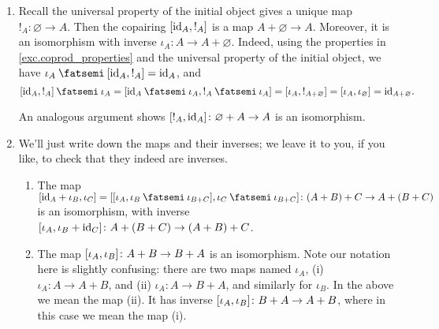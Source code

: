 \documentclass[7Sketches]{subfiles}
\begin{document}
{\begin{enumerate}
To show that $+$ is a functor, we need to also show it preserves composition.
Suppose we also have a morphism $(h,k)\colon (C,D) \to (E,F)$ in $\cat{C} \times
\cat{C}$. We need to show that $(f+g) \cp (h+k) = (f \cp h) + (g \cp k)$. This
is a slightly more complicated version of the argument in
\cref{exc.coprod_properties} 3. It follows from the fact the diagram below
commutes:
\[
    \begin{tikzcd}[ampersand replacement=\&]
      A \ar[rr,"\iota_A"] \ar[dr,"f"'] \& \& A+B \ar[d, "f+g"] \&\& B
      \ar[ll,"\iota_B"'] \ar[dl, "g"] \\[5pt]
      \& C \ar[r, "\iota_C"] \ar[dr,"h\cp \iota_E"'] \& C+D \ar[d,"h+k" near
      start] \& D
      \ar[l,"\iota_D"'] \ar[dl, "k \cp \iota_F"] \\[5pt]
      \&\& E+F
    \end{tikzcd}
\]
Indeed, we again use the uniqueness of the copairing in
\eqref{eqn.universal_prop_coprod}, this time to show that $(f \cp h) + (g \cp
k)=\copair{f\cp h \cp \iota_E, g\cp k \cp \iota_F} = (f+g) \cp (h+k)$, as
required.

\item Recall the universal property of the initial object gives a unique map
$!_A\colon \varnothing \to A$. Then the copairing $[\mathrm{id}_A,!_A]$ is a map
$A+\varnothing \to A$. Moreover, it is an isomorphism with inverse $\iota_A
\colon A \to A +\varnothing$. Indeed, using the properties in
\cref{exc.coprod_properties} and the universal property of the initial object,
we have $\iota_A \cp \copair{\id_A,!_A} = \id_A$, and 
\[
\copair{\id_A,!_A} \cp \iota_A = \copair{\id_A \cp \iota_A, !_A \cp \iota_A} =
\copair{\iota_A,!_{A+\varnothing}} = \copair{\iota_A,\iota_\varnothing} =
\id_{A+\varnothing}.
\]

An analogous argument shows $[!_A,\mathrm{id}_A] \colon \varnothing +A \to A$ is
an isomorphism.

\item We'll just write down the maps and their inverses; we leave it to you, if
you like, to check that they indeed are inverses.
\begin{enumerate}
\item The map $\copair{\id_A +\iota_B,\iota_C} = \copair{\copair{\iota_A,\iota_B \cp
\iota_{B+C}},\iota_C\cp\iota_{B+C}} \colon (A+B)+C \to A+(B+C)$ is an isomorphism,
with inverse $[\iota_A, \iota_B+\mathrm{id}_C] \colon A+(B+C) \to (A+B)+C$.
\item The map $[\iota_A,\iota_B]\colon A+B \to B+A$ is an isomorphism.
Note our notation here is slightly confusing: there are two maps named
$\iota_A$, (i) $\iota_A \colon A \to A+B$, and (ii) $\iota_A\colon A \to B+A$, and
similarly for $\iota_B$. In the above we mean the map (ii). It has inverse
$[\iota_A,\iota_B]\colon B+A \to A+B$, where in this case we mean the
map (i).
\end{enumerate}
\end{enumerate}
}
\end{document}
